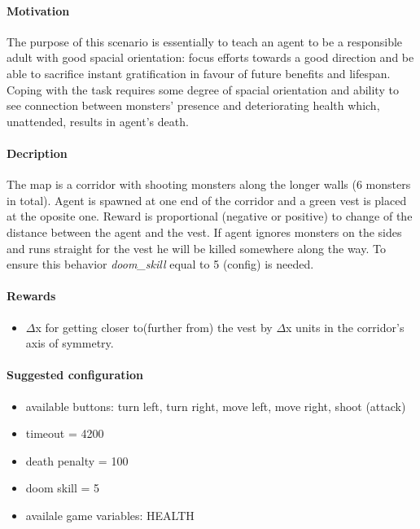 		\paragraph{Motivation} 
			The purpose of this scenario is essentially to teach an agent to be a responsible adult with good spacial orientation: focus efforts towards a good direction and be able to sacrifice instant gratification in favour of future benefits and lifespan. Coping with the task requires some degree of spacial orientation and ability to see connection between monsters' presence and deteriorating health which, unattended, results in agent's death.

		\paragraph{Decription}
			The map is a corridor with shooting monsters along the longer walls (6 monsters in total). Agent is spawned at one end of the corridor and a green vest is placed at the oposite one. Reward is proportional (negative or positive) to change of the distance between the agent and the vest. If agent ignores monsters on the sides and runs straight for the vest he will be killed somewhere along the way. To ensure this behavior \textit{doom\_skill} equal to 5 (config) is needed.

		\paragraph{Rewards}
			\begin{itemize}
				\item $\Delta$x for getting closer to(further from) the vest by $\Delta$x units in the corridor's axis of symmetry.
			\end{itemize}
			
		\paragraph{Suggested configuration}
			\begin{itemize}
				\item available buttons: turn left, turn right, move left, move right, shoot (attack)
				\item timeout = 4200
				\item death penalty = 100
				\item doom skill = 5
				\item availale game variables: HEALTH
			\end{itemize}
	\newpage

